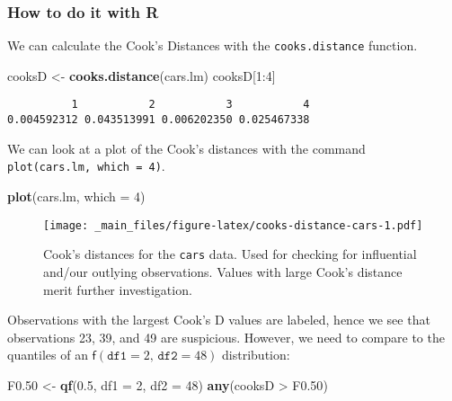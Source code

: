 \documentclass[]{book}
\newenvironment{Shaded}{\begin{snugshade}}{\end{snugshade}}
\newcommand{\KeywordTok}[1]{\textcolor[rgb]{0.13,0.29,0.53}{\textbf{{#1}}}}
\newcommand{\DataTypeTok}[1]{\textcolor[rgb]{0.13,0.29,0.53}{{#1}}}
\newcommand{\DecValTok}[1]{\textcolor[rgb]{0.00,0.00,0.81}{{#1}}}
\newcommand{\FloatTok}[1]{\textcolor[rgb]{0.00,0.00,0.81}{{#1}}}
\newcommand{\StringTok}[1]{\textcolor[rgb]{0.31,0.60,0.02}{{#1}}}
\newcommand{\NormalTok}[1]{{#1}}
\numberwithin{equation}{chapter}
\numberwithin{figure}{chapter}
\theoremstyle{plain}
\theoremstyle{definition}
\theoremstyle{remark}
\theoremstyle{definition}
\theoremstyle{definition}
\theoremstyle{remark}
\begin{document}
\subsubsection{How to do it with R}\label{how-to-do-it-with-r-29}

We can calculate the Cook's Distances with the \texttt{cooks.distance}
function.

\begin{Shaded}
\begin{Highlighting}[]
\NormalTok{cooksD <-}\StringTok{ }\KeywordTok{cooks.distance}\NormalTok{(cars.lm)}
\NormalTok{cooksD[}\DecValTok{1}\NormalTok{:}\DecValTok{4}\NormalTok{]}
\end{Highlighting}
\end{Shaded}

\begin{verbatim}
          1           2           3           4 
0.004592312 0.043513991 0.006202350 0.025467338 
\end{verbatim}

We can look at a plot of the Cook's distances with the command
\texttt{plot(cars.lm,\ which\ =\ 4)}.

\begin{Shaded}
\begin{Highlighting}[]
\KeywordTok{plot}\NormalTok{(cars.lm, }\DataTypeTok{which =} \DecValTok{4}\NormalTok{)}
\end{Highlighting}
\end{Shaded}

\begin{figure}[htbp]
\centering
\texttt{[image: \_main\_files/figure-latex/cooks-distance-cars-1.pdf]}
\caption{\label{fig:cooks-distance-cars}\small Cook's distances for the
\texttt{cars} data. Used for checking for influential and/our outlying
observations. Values with large Cook's distance merit further
investigation.}
\end{figure}






Observations with the largest Cook's D values are labeled, hence we see
that observations 23, 39, and 49 are suspicious. However, we need to
compare to the quantiles of an
\(\mathsf{f}(\mathtt{df1} = 2, \,\mathtt{df2} = 48)\) distribution:

\begin{Shaded}
\begin{Highlighting}[]
\NormalTok{F0}\FloatTok{.50} \NormalTok{<-}\StringTok{ }\KeywordTok{qf}\NormalTok{(}\FloatTok{0.5}\NormalTok{, }\DataTypeTok{df1 =} \DecValTok{2}\NormalTok{, }\DataTypeTok{df2 =} \DecValTok{48}\NormalTok{)}
\KeywordTok{any}\NormalTok{(cooksD >}\StringTok{ }\NormalTok{F0}\FloatTok{.50}\NormalTok{)}
\end{Highlighting}
\end{Shaded}
\end{document}
